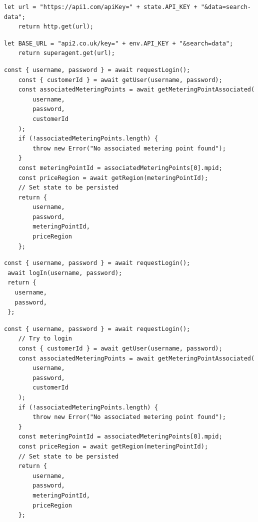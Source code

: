 \documentclass[jou,apacite]{apa6}
\begin{document}
\begin{lstlisting}[caption=Comparison 5a - Similar functions with literal and identifier name changes]
	let url = "https://api1.com/apiKey=" + state.API_KEY + "&data=search-data";
	return http.get(url);
\end{lstlisting}

\begin{lstlisting}[caption=Comparison 5b - Similar functions with literal and identifier name changes]
	let BASE_URL = "api2.co.uk/key=" + env.API_KEY + "&search=data";
	return superagent.get(url);
\end{lstlisting}

\begin{lstlisting}[caption=Comparison 6a - Real integration connect bodies (dissimiliar)]
    const { username, password } = await requestLogin();
    const { customerId } = await getUser(username, password);
    const associatedMeteringPoints = await getMeteringPointAssociated(
        username,
        password,
        customerId
    );
    if (!associatedMeteringPoints.length) {
        throw new Error("No associated metering point found");
    }
    const meteringPointId = associatedMeteringPoints[0].mpid;
    const priceRegion = await getRegion(meteringPointId);
    // Set state to be persisted
    return {
        username,
        password,
        meteringPointId,
        priceRegion
    };
\end{lstlisting}

\begin{lstlisting}[caption=Comparison 6b - Real integration connect bodies (dissimiliar)]
 const { username, password } = await requestLogin();
 await logIn(username, password);
 return {
   username,
   password,
 };
\end{lstlisting}

\begin{lstlisting}[caption=Comparison 7a - Real integration against order scrambled integration]
	const { username, password } = await requestLogin();
	// Try to login
	const { customerId } = await getUser(username, password);
	const associatedMeteringPoints = await getMeteringPointAssociated(
		username,
		password,
		customerId
	);
	if (!associatedMeteringPoints.length) {
		throw new Error("No associated metering point found");
	}
	const meteringPointId = associatedMeteringPoints[0].mpid;
	const priceRegion = await getRegion(meteringPointId);
	// Set state to be persisted
	return {
		username,
		password,
		meteringPointId,
		priceRegion
	};
\end{lstlisting}
\end{document}
